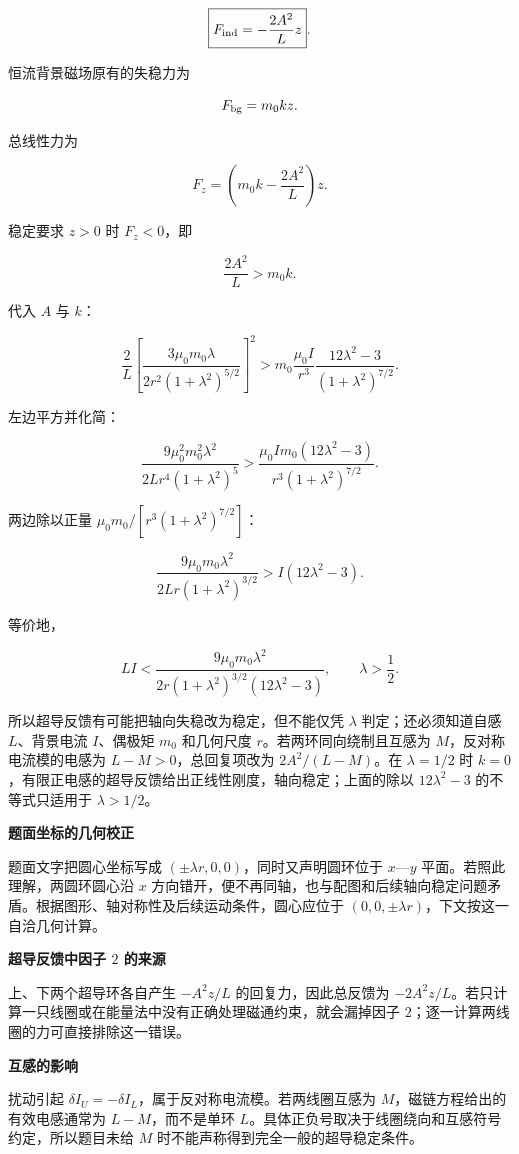 \documentclass[12pt,a4paper,UTF8]{ctexart}
\begin{document}
\[
\boxed{
F_{\rm ind}=-\frac{2A^2}{L}z
}.
\]

恒流背景磁场原有的失稳力为

\[
F_{\rm bg}=m_0kz.
\]

总线性力为

\[
F_z=\left(m_0k-\frac{2A^2}{L}\right)z.
\]

稳定要求 \(z>0\) 时 \(F_z<0\)，即

\[
\frac{2A^2}{L}>m_0k.
\]

代入 \(A\) 与 \(k\)：

\[
\frac{2}{L}
\left[
\frac{3\mu_0m_0\lambda}
{2r^2(1+\lambda^2)^{5/2}}
\right]^2
>
m_0\frac{\mu_0I}{r^3}
\frac{12\lambda^2-3}{(1+\lambda^2)^{7/2}}.
\]

左边平方并化简：

\[
\frac{9\mu_0^2m_0^2\lambda^2}
{2Lr^4(1+\lambda^2)^5}
>
\frac{\mu_0Im_0(12\lambda^2-3)}
{r^3(1+\lambda^2)^{7/2}}.
\]

两边除以正量 \(\mu_0m_0/[r^3(1+\lambda^2)^{7/2}]\)：

\[
\boxed{
\frac{9\mu_0m_0\lambda^2}
{2Lr(1+\lambda^2)^{3/2}}
>I(12\lambda^2-3)
}.
\]

等价地，

\[
\boxed{
LI<
\frac{9\mu_0m_0\lambda^2}
{2r(1+\lambda^2)^{3/2}(12\lambda^2-3)}
},
\qquad \lambda>\frac12.
\]

所以超导反馈有可能把轴向失稳改为稳定，但不能仅凭 \(\lambda\)
判定；还必须知道自感 \(L\)、背景电流 \(I\)、偶极矩 \(m_0\) 和几何尺度
\(r\)。若两环同向绕制且互感为 \(M\)，反对称电流模的电感为
\(L-M>0\)，总回复项改为 \(2A^2/(L-M)\)。在 \(\lambda=1/2\) 时
\(k=0\)，有限正电感的超导反馈给出正线性刚度，轴向稳定；上面的除以
\(12\lambda^2-3\) 的不等式只适用于 \(\lambda>1/2\)。

\textbf{题面坐标的几何校正}

题面文字把圆心坐标写成 \((\pm\lambda r,0,0)\)，同时又声明圆环位于
\(x\)---\(y\) 平面。若照此理解，两圆环圆心沿 \(x\)
方向错开，便不再同轴，也与配图和后续轴向稳定问题矛盾。根据图形、轴对称性及后续运动条件，圆心应位于
\((0,0,\pm\lambda r)\)，下文按这一自洽几何计算。

\textbf{超导反馈中因子 \(2\) 的来源}

上、下两个超导环各自产生 \(-A^2z/L\) 的回复力，因此总反馈为
\(-2A^2z/L\)。若只计算一只线圈或在能量法中没有正确处理磁通约束，就会漏掉因子
\(2\)；逐一计算两线圈的力可直接排除这一错误。

\textbf{互感的影响}

扰动引起 \(\delta I_U=-\delta I_L\)，属于反对称电流模。若两线圈互感为
\(M\)，磁链方程给出的有效电感通常为 \(L-M\)，而不是单环
\(L\)。具体正负号取决于线圈绕向和互感符号约定，所以题目未给 \(M\)
时不能声称得到完全一般的超导稳定条件。
\end{document}
